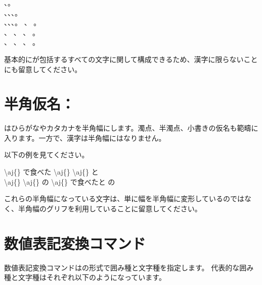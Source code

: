 \documentclass[uplatex, dvipdfmx, paper=a4paper, line_length=45zw, head_space=7zw, foot_space=10zw]{jlreq}
\begin{document}
\begin{demosource}
  、。\\
  、、、。\\
  、、、。
  \tcblower
  、
  。\\
  、
  、
  、
  。\\
  、
  、
  、
  。
\end{demosource}

基本的に{\AdobeJapan}が包括するすべての文字に関して構成できるため、漢字に限らないことにも留意してください。

\section{半角仮名：\texorpdfstring{}{\textbackslash aj半角}}

はひらがなやカタカナを半角幅にします。濁点、半濁点、小書きの仮名も範疇に入ります。一方で、漢字は半角幅にはなりません。

以下の例を見てください。

\begin{demosource}[0.3]
  {\textbackslash}aj\{\}%
  で食べた%
  {\textbackslash}aj\{\}%
  {\textbackslash}aj\{\}%
  と\\%
  {\textbackslash}aj\{\}%
  {\textbackslash}aj\{\}%
  の%
  {\textbackslash}aj\{\}%
  \tcblower
  {\ibmfamily {}で食べたと%
  の}
\end{demosource}

これらの半角幅になっている文字は、単に幅を半角幅に変形しているのではなく、半角幅のグリフを利用していることに留意してください。

\section{数値表記変換コマンド}

数値表記変換コマンドはの形式で囲み種と文字種を指定します。
代表的な囲み種と文字種はそれぞれ以下のようになっています。
\end{document}
